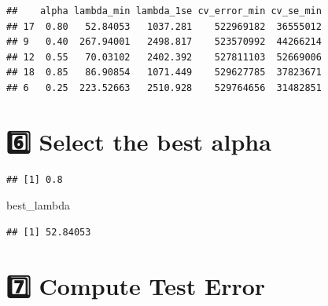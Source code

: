 \documentclass[
]{article}
\newenvironment{Shaded}{\begin{snugshade}}{\end{snugshade}}
\newcommand{\FunctionTok}[1]{\textcolor[rgb]{0.13,0.29,0.53}{\textbf{#1}}}
\newcommand{\NormalTok}[1]{#1}
\newcommand{\OtherTok}[1]{\textcolor[rgb]{0.56,0.35,0.01}{#1}}
\newcommand{\SpecialCharTok}[1]{\textcolor[rgb]{0.81,0.36,0.00}{\textbf{#1}}}
\begin{document}
\begin{verbatim}
##    alpha lambda_min lambda_1se cv_error_min cv_se_min
## 17  0.80   52.84053   1037.281    522969182  36555012
## 9   0.40  267.94001   2498.817    523570992  44266214
## 12  0.55   70.03102   2402.392    527811103  52669006
## 18  0.85   86.90854   1071.449    529627785  37823671
## 6   0.25  223.52663   2510.928    529764656  31482851
\end{verbatim}

\section{6️⃣ Select the best alpha}\label{select-the-best-alpha}

\begin{Shaded}
\end{Shaded}

\begin{verbatim}
## [1] 0.8
\end{verbatim}

\begin{Shaded}
\begin{Highlighting}[]
\NormalTok{best\_lambda}
\end{Highlighting}
\end{Shaded}

\begin{verbatim}
## [1] 52.84053
\end{verbatim}

\section{7️⃣ Compute Test Error}\label{compute-test-error}
\end{document}
